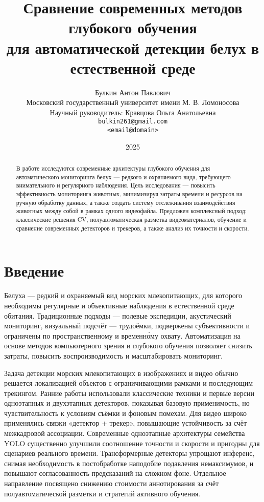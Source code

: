 \documentclass{article}
\title{Сравнение современных методов глубокого обучения\\
для автоматической детекции белух в естественной среде}
\author{
  Булкин Антон Павлович \\
	Московский государственный университет имени М. В. Ломоносова \\
        Научный руководитель: Кравцова Ольга Анатольевна \\
 \texttt{bulkin261@gmail.com} \\
  \texttt{<email@domain>} %
}
\date{2025} %
\begin{document}
\maketitle

\begin{abstract}
В работе исследуются современные архитектуры глубокого обучения для автоматического мониторинга белух — редкого и охраняемого вида, требующего внимательного и регулярного наблюдения. Цель исследования — повысить эффективность мониторинга животных, минимизируя затраты времени и ресурсов на ручную обработку данных, а также создать систему отслеживания взаимодействия животных между собой в рамках одного видеофайла. Предложен комплексный подход: классические решения CV, полуавтоматическая разметка видеоматериалов, обучение и сравнение современных детекторов и трекеров, а также анализ их точности и скорости.
\end{abstract}


\section{Введение}
Белуха — редкий и охраняемый вид морских млекопитающих, для которого необходимы регулярные и объективные наблюдения в естественной среде обитания. Традиционные подходы — полевые экспедиции, акустический мониторинг, визуальный подсчёт — трудоёмки, подвержены субъективности и ограничены по пространственному и временно́му охвату. Автоматизация на основе методов компьютерного зрения и глубокого обучения позволяет снизить затраты, повысить воспроизводимость и масштабировать мониторинг.

Задача детекции морских млекопитающих в изображениях и видео обычно решается локализацией объектов с ограничивающими рамками и последующим трекингом. Ранние работы использовали классические техники и первые версии одноэтапных и двухэтапных детекторов, показывая базовую применимость, но чувствительность к условиям съёмки и фоновым помехам. Для видео широко применялись связки «детектор + трекер», повышающие устойчивость за счёт межкадровой ассоциации. Современные одноэтапные архитектуры семейства YOLO существенно улучшили соотношение точности и скорости и пригодны для сценариев реального времени. Трансформерные детекторы упрощают инференс, снимая необходимость в постобработке наподобие подавления немаксимумов, и повышают согласованность предсказаний на сложном фоне. Отдельное направление посвящено снижению стоимости аннотирования за счёт полуавтоматической разметки и стратегий активного обучения.
\end{document}
